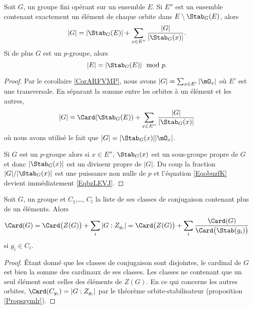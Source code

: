 \begin{proposition}     \label{PropUyLPdp}
    Soit \( G\), un groupe fini opérant sur un ensemble \( E\). Si \( E''\) est un ensemble contenant exactement un élément de chaque orbite dans \( E\setminus\Stab_G(E)\), alors
    \begin{equation}        \label{EqobuzfK}
        | G |=| \Stab_G(E) |+\sum_{x\in E''}\frac{ | G | }{ | \Stab_G(x) | }.
    \end{equation}
    Si de plus \( G\) est un $p$-groupe, alors 
    \begin{equation}    \label{EqbzLEVJ}
        | E |=| \Stab_G(E) |\mod p.
    \end{equation}
\end{proposition}


\begin{proof}
    Par le corollaire \ref{CorARFVMP}, nous avons \( | G |=\sum_{x\in E'}| \mO_x |\) où \( E'\) est une transversale.  En séparant la somme entre les orbites à un élément et les autres,
    \begin{equation}    \label{EqeggkBs}
        | G |=\Card(\Stab_G(E))+\sum_{x\in E''}\frac{ | G | }{ | \Stab_G(x) | }
    \end{equation}  \label{EqDgYbhm}
    où nous avons utilisé le fait que \( | G |=| \Stab_G(x) | |\mO_x |\).

    Si \( G\) est un \( p\)-groupe alors si \( x\in E''\), \( \Stab_G(x)\) est un sous-groupe propre de \( G\) et donc \( | \Stab_G(x) |\) est un diviseur propre de \( | G |\). Du coup la fraction \( | G |/|\Stab_G(x)|\) est une puissance non nulle de \( p\) et l'équation \eqref{EqobuzfK} devient immédiatement \eqref{EqbzLEVJ}.
\end{proof}
 

\begin{corollary}
    Soit \( G\), un groupe et \( C_1\),\ldots, \( C_l\) la liste de ses classes de conjugaison contenant plus de un éléments. Alors
    \begin{equation}        \label{EqkgGmoq}
        \Card(G)=\Card\big( Z(G) \big)+\sum_i| G:Z_{g_i} |=\Card\big( Z(G) \big)+\sum_i\frac{ \Card(G) }{ \Card\big( \Stab(g_i) \big) }
    \end{equation}
    si \( g_i\in C_i\).
\end{corollary}

\begin{proof}
    Étant donné que les classes de conjugaison sont disjointes, le cardinal de \( G\) est bien la somme des cardinaux de ses classes. Les classes ne contenant que un seul élément sont celles des éléments de \( Z(G)\). En ce qui concerne les autres orbites, \( \Card(C_{g_i})=| G:Z_{g_i} |\) par le théorème orbite-stabilisateur (proposition \ref{Propszymlr}).
\end{proof}

